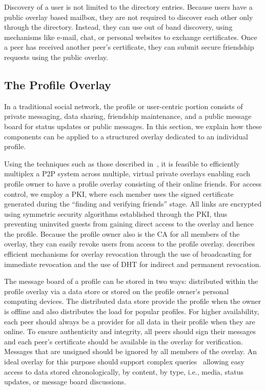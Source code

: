 \documentclass[conference]{IEEEtran}
\begin{document}
Discovery of a user is not limited to the directory entries.  Because users
have a public overlay based mailbox, they are not required to discover each
other only through the directory.  Instead, they can use out of band discovery,
using mechanisms like e-mail, chat, or personal websites to exchange
certificates.  Once a peer has received another peer's certificate, they can
submit secure friendship requests using the public overlay.

\subsection{The Profile Overlay}
\label{profile_overlay}

In a traditional social network, the profile or user-centric portion consists
of private messaging, data sharing, friendship maintenance, and a public
message board for status updates or public messages.  In this section, we
explain how these components can be applied to a structured overlay dedicated
to an individual profile.

Using the techniques such as those described in~\cite{vpo}, it is feasible to
efficiently multiplex a P2P system across multiple, virtual private overlays
enabling each profile owner to have a profile overlay consisting of their
online friends.  For access control, we employ a PKI, where each member uses
the signed certificate generated during the ``finding and verifying friends''
stage.  All links are encrypted using symmetric security algorithms established
through the PKI, thus preventing uninvited guests from gaining direct access to
the overlay and hence the profile.  Because the profile owner also is the CA
for all members of the overlay, they can easily revoke users from access to the
profile overlay.  \cite{vpo} describes efficient mechanisms for overlay
revocation through the use of broadcasting for immediate revocation and the use
of DHT for indirect and permanent revocation.

The message board of a profile can be stored in two ways: distributed within
the profile overlay via a data store or stored on the profile owner's personal
computing devices.  The distributed data store provide the profile when the
owner is offline and also distributes the load for popular profiles.  For
higher availability, each peer should always be a provider for all data in
their profile when they are online.  To ensure authenticity and integrity, all
peers should sign their messages and each peer's certificate should be
available in the overlay for verification.  Messages that are unsigned should
be ignored by all members of the overlay.  An ideal overlay for this purpose
should support complex queries~\cite{complex_queries} allowing easy access to
data stored chronologically, by content, by type, i.e., media, status updates,
or message board discussions.
\end{document}
